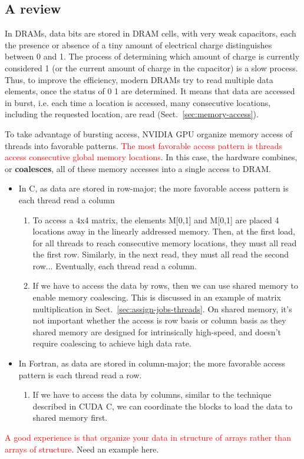 \subsection{A review}
\label{sec:review}

In DRAMs, data bits are stored in DRAM cells, with very weak
capacitors, each the presence or absence of a tiny amount of
electrical charge distinguishes between 0 and 1. The process of
determining which amount of charge is currently considered 1 (or the
current amount of charge in the capacitor) is a slow process. Thus, to
improve the efficiency, modern DRAMs try to read multiple data
elements, once the status of 0 1 are determined. It means that data
are accessed in burst, i.e. each time a location is accessed, many
consecutive locations, including the requested location, are read
(Sect.~\ref{sec:memory-access}).

To take advantage of bursting access, NVIDIA GPU organize memory
access of threads into favorable patterns.
\textcolor{red}{The most favorable access pattern is threads access
  consecutive global memory locations}.
In this case, the hardware combines, or {\bf coalesces}, all of these
memory accesses into a single access to DRAM.
\begin{itemize}
\item In C, as data are stored in row-major; the more favorable access
  pattern is each thread read a column
  \begin{enumerate}
  \item To access a 4x4 matrix, the elements M[0,1] and M[0,1] are
    placed 4 locations away in the linearly addressed memory. Then, at
    the first load, for all threads to reach consecutive memory
    locations, they must all read the first row. Similarly, in the
    next read, they must all read the second row... Eventually,
    each thread read a column.
  \item If we have to access the data by rows, then we can use shared
    memory to enable memory coalescing. This is discussed in an
    example of matrix multiplication in
    Sect.~\ref{sec:assign-jobs-threads}. On shared memory, it's not
    important whether the access is row basis or column basis as they
    shared memory are designed for intrinsically high-speed, and
    doesn't require coalescing to achieve high data rate. 
  \end{enumerate}
\item In Fortran, as data are stored in column-major; the more
  favorable access pattern is each thread read a row. 
  \begin{enumerate}
  \item If we have to access the data by columns, similar to the
    technique described in CUDA C, we can coordinate the blocks to
    load the data to shared memory first. 
  \end{enumerate}
\end{itemize}
\textcolor{red}{A good experience is that organize your data in structure of arrays
  rather than arrays of structure}. Need an example here. 

